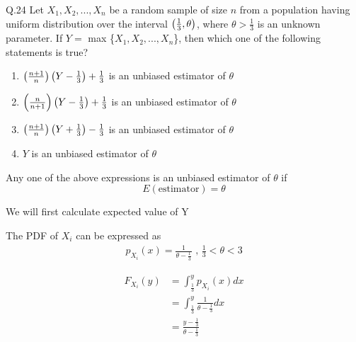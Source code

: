 \documentclass{article}[]
\begin{document}
	\newcommand*{\permcomb}[4][0mu]{{{}^{#3}\mkern#1#2_{#4}}}
\newcommand*{\perm}[1][-3mu]{\permcomb[#1]{P}}
\newcommand*{\comb}[1][-1mu]{\permcomb[#1]{C}}
\providecommand{\qfunc}[1]{\ensuremath{Q\left(#1\right)}}
\providecommand{\gauss}[2]{\mathcal{N}\ensuremath{\left(#1,#2\right)}}
\providecommand{\diff}[2]{\ensuremath{\frac{d{#1}}{d{#2}}}}
\providecommand{\myceil}[1]{\left \lceil #1 \right \rceil }
\newcommand\figref{Fig.~\ref}
\newcommand\tabref{Table~\ref}
\newcommand{\sinc}{\,\text{sinc}\,}
\newcommand{\rect}{\,\text{rect}\,}

\let\vec\mathbf

Q.24 Let $X_1, X_2,...,X_n$ be a random sample of size $n$ from a population having uniform distribution over the interval $\left(\frac{1}{3},\theta\right)$, where $\theta>\frac{1}{3}$ is an unknown parameter. If $Y = $ max \{$X_1, X_2,...,X_n$\}, then which one of the following statements is true?
\begin{enumerate}
\item $\left(\frac{n+1}{n}\right)\left(Y-\frac{1}{3}\right) + \frac{1}{3}$ is an unbiased estimator of $\theta$
\item $\left(\frac{n}{n+1}\right)\left(Y-\frac{1}{3}\right) + \frac{1}{3}$ is an unbiased estimator of $\theta$
\item $\left(\frac{n+1}{n}\right)\left(Y+\frac{1}{3}\right) - \frac{1}{3}$ is an unbiased estimator of $\theta$
\item $Y$ is an unbiased estimator of $\theta$
\end{enumerate} 

\solution

Any one of the above expressions is an unbiased estimator of $\theta$ if 
$$E(\text{estimator})=\theta$$

We will first calculate expected value of Y

The PDF of $X_i$ can be expressed as
\begin{align}
p_{X_i}(x)=\frac{1}{\theta-\frac{1}{3}} \text{ , }  \frac{1}{3}<\theta<3
\end{align}

\begin{align}
F_{X_i}(y)&=\int_{\frac{1}{3}}^{y} p_{X_i}(x) dx \\
&=\int_{\frac{1}{3}}^{y} \frac{1}{\theta-\frac{1}{3}} dx \\
&=\frac{y-\frac{1}{3}}{\theta-\frac{1}{3}}
\end{align}
\end{document}
